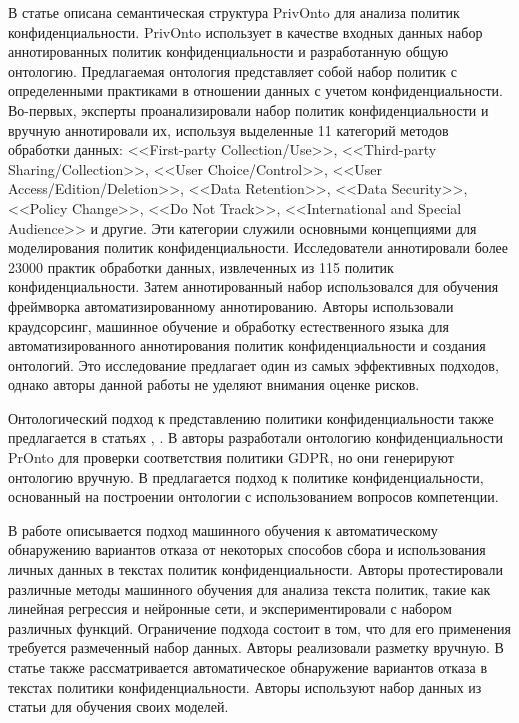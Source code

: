 \documentclass[../main]{subfiles}
\begin{document}
В статье \cite{MDPI6} описана семантическая структура PrivOnto для анализа политик конфиденциальности. PrivOnto использует в качестве входных данных набор аннотированных политик конфиденциальности и разработанную общую онтологию. Предлагаемая онтология представляет собой набор политик с определенными практиками в отношении данных с учетом конфиденциальности. Во-первых, эксперты проанализировали набор политик конфиденциальности и вручную аннотировали их, используя выделенные 11 категорий методов обработки данных: <<First-party Collection/Use>>, <<Third-party Sharing/Col\-lection>>, <<User Choice/Control>>, <<User Access/Edition/Deletion>>, <<Data Retention>>, <<Data Security>>, <<Policy Change>>, <<Do Not Track>>, <<International and Special Audience>> и другие. Эти категории служили основными концепциями для моделирования политик конфиденциальности. Исследователи аннотировали более 23000 практик обработки данных, извлеченных из 115 политик конфиденциальности. Затем аннотированный набор использовался для обучения фреймворка автоматизированному аннотированию. Авторы использовали краудсорсинг, машинное обучение и обработку естественного языка для автоматизированного аннотирования политик конфиденциальности и создания онтологий. Это исследование предлагает один из самых эффективных подходов, однако авторы данной работы не уделяют внимания оценке рисков.

Онтологический подход к представлению политики конфиденциальности также предлагается в статьях \cite{MDPI7}, \cite{MDPI8}. В \cite{MDPI7} авторы разработали онтологию конфиденциальности PrOnto для проверки соответствия политики GDPR, но они генерируют онтологию вручную. В \cite{MDPI8} предлагается подход к политике конфиденциальности, основанный на построении онтологии с использованием вопросов компетенции.

В работе \cite{MDPI9} описывается подход машинного обучения к автоматическому обнаружению вариантов отказа от некоторых способов сбора и использования личных данных в текстах политик конфиденциальности. Авторы \cite{MDPI9} протестировали различные методы машинного обучения для анализа текста политик, такие как линейная регрессия и нейронные сети, и экспериментировали с набором различных функций. Ограничение подхода состоит в том, что для его применения требуется размеченный набор данных. Авторы реализовали разметку вручную. В статье \cite{MDPI10} также рассматривается автоматическое обнаружение вариантов отказа в текстах политики конфиденциальности. Авторы используют набор данных из статьи \cite{MDPI6} для обучения своих моделей.
\end{document}
